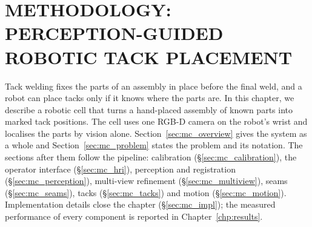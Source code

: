 \chapter{METHODOLOGY: PERCEPTION-GUIDED ROBOTIC TACK PLACEMENT}
\label{chp:method_cell}

Tack welding fixes the parts of an assembly in place before the final weld, and a robot can
place tacks only if it knows where the parts are. In this chapter, we describe a robotic cell
that turns a hand-placed assembly of known parts into marked tack positions. The cell uses one
RGB-D camera on the robot's wrist and localises the parts by vision alone.
Section~\ref{sec:mc_overview} gives the system as a whole and Section~\ref{sec:mc_problem}
states the problem and its notation. The sections after them follow the pipeline: calibration
(\S\ref{sec:mc_calibration}), the operator interface (\S\ref{sec:mc_hri}), perception and
registration (\S\ref{sec:mc_perception}), multi-view refinement (\S\ref{sec:mc_multiview}),
seams (\S\ref{sec:mc_seams}), tacks (\S\ref{sec:mc_tacks}) and motion (\S\ref{sec:mc_motion}).
Implementation details close the chapter (\S\ref{sec:mc_impl}); the measured performance of
every component is reported in Chapter~\ref{chp:results}.

